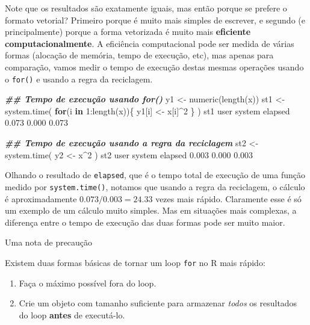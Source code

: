 \documentclass[
  10pt,
  a4paper]{book}
\newenvironment{Shaded}{\begin{snugshade}}{\end{snugshade}}
\newcommand{\ControlFlowTok}[1]{\textcolor[rgb]{0.13,0.29,0.53}{\textbf{#1}}}
\newcommand{\DecValTok}[1]{\textcolor[rgb]{0.00,0.00,0.81}{#1}}
\newcommand{\DocumentationTok}[1]{\textcolor[rgb]{0.56,0.35,0.01}{\textbf{\textit{#1}}}}
\newcommand{\FloatTok}[1]{\textcolor[rgb]{0.00,0.00,0.81}{#1}}
\newcommand{\FunctionTok}[1]{\textcolor[rgb]{0.00,0.00,0.00}{#1}}
\newcommand{\NormalTok}[1]{#1}
\newcommand{\OtherTok}[1]{\textcolor[rgb]{0.56,0.35,0.01}{#1}}
\newcommand{\SpecialCharTok}[1]{\textcolor[rgb]{0.00,0.00,0.00}{#1}}
\providecommand{\tightlist}{%
  \setlength{\itemsep}{0pt}\setlength{\parskip}{0pt}}
\begin{document}
Note que os resultados são exatamente iguais, mas então porque se
prefere o formato vetorial? Primeiro porque é muito mais simples de
escrever, e segundo (e principalmente) porque a forma vetorizada é
muito mais \textbf{eficiente computacionalmente}. A eficiência computacional
pode ser medida de várias formas (alocação de memória, tempo de
execução, etc), mas apenas para comparação, vamos medir o tempo de
execução destas mesmas operações usando o \texttt{for()} e usando a regra da
reciclagem.

\begin{Shaded}
\begin{Highlighting}[]
\DocumentationTok{\#\# Tempo de execução usando for()}
\NormalTok{y1 }\OtherTok{\textless{}{-}} \FunctionTok{numeric}\NormalTok{(}\FunctionTok{length}\NormalTok{(x))}
\NormalTok{st1 }\OtherTok{\textless{}{-}} \FunctionTok{system.time}\NormalTok{(}
    \ControlFlowTok{for}\NormalTok{(i }\ControlFlowTok{in} \DecValTok{1}\SpecialCharTok{:}\FunctionTok{length}\NormalTok{(x))\{}
\NormalTok{        y1[i] }\OtherTok{\textless{}{-}}\NormalTok{ x[i]}\SpecialCharTok{\^{}}\DecValTok{2}
\NormalTok{    \}}
\NormalTok{)}
\NormalTok{st1}
\NormalTok{   user  system elapsed }
  \FloatTok{0.073}   \FloatTok{0.000}   \FloatTok{0.073} 

\DocumentationTok{\#\# Tempo de execução usando a regra da reciclagem}
\NormalTok{st2 }\OtherTok{\textless{}{-}} \FunctionTok{system.time}\NormalTok{(}
\NormalTok{    y2 }\OtherTok{\textless{}{-}}\NormalTok{ x}\SpecialCharTok{\^{}}\DecValTok{2}
\NormalTok{)}
\NormalTok{st2}
\NormalTok{   user  system elapsed }
  \FloatTok{0.003}   \FloatTok{0.000}   \FloatTok{0.003} 
\end{Highlighting}
\end{Shaded}

Olhando o resultado de \texttt{elapsed}, que é o tempo total de execução de uma
função medido por \texttt{system.time()}, notamos que usando a regra da
reciclagem, o cálculo é aproximadamente
\(0.073/0.003 = 24.33\) vezes mais rápido.
Claramente esse é só um exemplo de um cálculo muito simples. Mas em
situações mais complexas, a diferença entre o tempo de execução das duas
formas pode ser muito maior.

Uma nota de precaução

Existem duas formas básicas de tornar um loop \texttt{for} no R mais rápido:

\begin{enumerate}
\def\labelenumi{\arabic{enumi}.}
\tightlist
\item
  Faça o máximo possível fora do loop.
\item
  Crie um objeto com tamanho suficiente para armazenar \emph{todos} os
  resultados do loop \textbf{antes} de executá-lo.
\end{enumerate}
\end{document}
